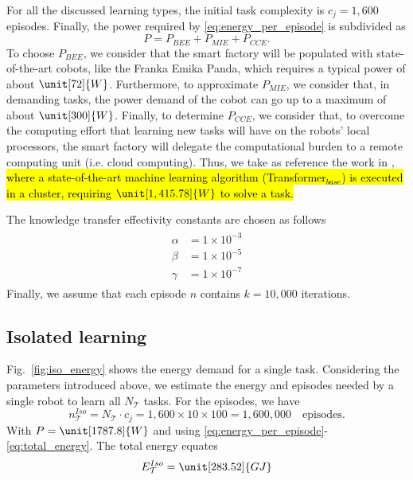 For all the discussed learning types, the initial task complexity is $c_j = 1,600$ episodes. Finally, the power required by \eqref{eq:energy_per_episode} is subdivided as 
\begin{equation}
    P = P_{BEE}+P_{MIE} + P_{CCE}.
\end{equation}
To choose $P_{BEE}$, we consider that the smart factory will be populated with state-of-the-art cobots, like the Franka Emika Panda, which requires a typical power of about $\unit[72]{W}$. Furthermore, to approximate $P_{MIE}$, we consider that, in demanding tasks, the power demand of the cobot can go up to a maximum of about $ \unit[300] {W} $. Finally, to determine $P_{CCE}$, we consider that, to overcome the computing effort that learning new tasks will have on the robots' local processors, the smart factory will delegate the computational burden to a remote computing unit (i.e. cloud computing). Thus, we take as reference the work in \cite{Strubell2019EnergyAP}, \hl{where a state-of-the-art machine learning algorithm ({Transformer}$_{base}$) is executed in a cluster, requiring $\unit[1,415.78]{W}$ to solve a task.}

The knowledge transfer effectivity constants are chosen as follows
\begin{align}\label{eq:transfer_constants}
\begin{split}
    \alpha &=1\times10^{-3}\\
    \beta &=1\times10^{-5}\\
    \gamma &=1\times10^{-7}    
\end{split}
\end{align}
Finally, we assume that each episode $n$ contains $k=10,000$ iterations.


\subsection{Isolated learning}
Fig.~\ref{fig:iso_energy} shows the energy demand for a single task. Considering the parameters introduced above, we  estimate the energy and episodes needed by a single robot to learn all $N_{\mathcal{T}}$ tasks. For the episodes, we have
\begin{equation}
    n^{Iso}_{\mathcal{T}} = N_{\mathcal{T}} \cdot c_j = 1,600\times 10 \times 100 = 1,600,000 \quad\text{episodes}.
\end{equation}
With $P=\unit[1787.8]{W}$ and using \eqref{eq:energy_per_episode}-\eqref{eq:total_energy}. The total energy equates
\begin{equation}
    E^{Iso}_{\mathcal{T}} = \unit[283.52]{GJ} %
\end{equation}
 
